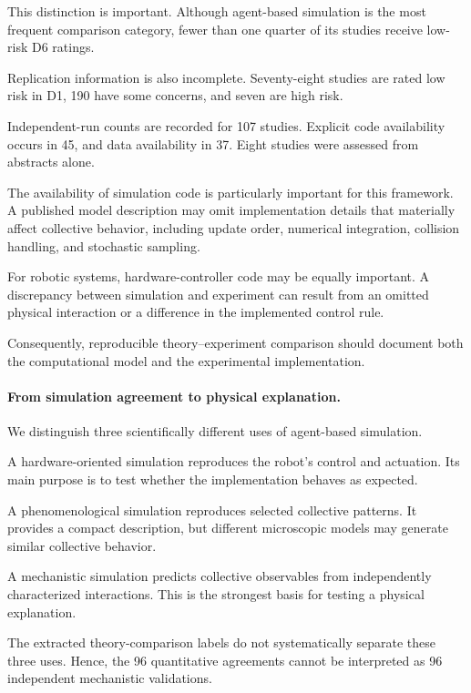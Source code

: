 This distinction is
important. Although
agent-based simulation
is the most frequent
comparison category,
fewer than one quarter
of its studies receive
low-risk D6 ratings.

Replication information
is also incomplete.
Seventy-eight studies
are rated low risk
in D1, 190 have
some concerns,
and seven are high risk.

Independent-run counts
are recorded for
107 studies.
Explicit code availability
occurs in 45,
and data availability
in 37.
Eight studies were
assessed from
abstracts alone.

The availability
of simulation code
is particularly
important for this
framework.
A published model
description may omit
implementation details
that materially affect
collective behavior,
including update order,
numerical integration,
collision handling,
and stochastic
sampling.

For robotic systems,
hardware-controller
code may be equally
important.
A discrepancy between
simulation and experiment
can result from
an omitted physical
interaction or
a difference in
the implemented
control rule.

Consequently,
reproducible
theory--experiment
comparison should
document both
the computational
model and the
experimental
implementation.

\paragraph*{From simulation agreement to physical explanation.}

We distinguish three scientifically
different uses of agent-based simulation.

A hardware-oriented
simulation reproduces
the robot's control
and actuation.
Its main purpose
is to test whether
the implementation
behaves as expected.

A phenomenological
simulation reproduces
selected collective
patterns.
It provides a
compact description,
but different
microscopic models
may generate similar
collective behavior.

A mechanistic
simulation predicts
collective observables
from independently
characterized
interactions.
This is the
strongest basis
for testing a
physical explanation.

The extracted
theory-comparison
labels do not
systematically
separate these
three uses.
Hence, the 96
quantitative agreements
cannot be interpreted
as 96 independent
mechanistic validations.

